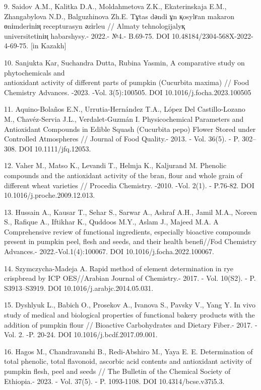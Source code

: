 \begin{references}
9. Saidov A.M., Kalitka D.A., Moldahmetova Z.K., Ekaterinskaja E.M.,
Zhangabylova N.D., Balguzhinova Zh.E. Tұtas dәndі ұn қosylғan makaron
өnіmderіnің recepturasyn әzіrleu // Almaty tehnologijalyқ\\
universitetіnің habarshysy.- 2022.- №4.- B.69-75. DOI
10.48184/2304-568X-2022-4-69-75. {[}in Kazakh{]}

10. Sanjukta Kar, Suchandra Dutta, Rubina Yasmin, A comparative study on
phytochemicals and \\antioxidant activity of different parts of pumpkin
(Cucurbita maxima) // Food Chemistry Advances. -2023. -Vol. 3(5):100505.
DOI 10.1016/j.focha.2023.100505

11. Aquino-Bolaños E.N., Urrutia-Hernández T.A., López Del
Castillo-Lozano M., Chavéz-Servia J.L., Verdalet-Guzmán I.
Physicochemical Parameters and Antioxidant Compounds in Edible Squash
(Cucurbita pepo) Flower Stored under Controlled Atmospheres // Journal
of Food Quality.- 2013. - Vol. 36(5). - P. 302--308. DOI
10.1111/jfq.12053.

12. Vaher M., Matso K., Levandi T., Helmja K., Kaljurand M. Phenolic
compounds and the antioxidant activity of the bran, flour and whole
grain of different wheat varieties // Procedia Chemistry. -2010. -Vol.
2(1). - P.76-82. DOI 10.1016/j.proche.2009.12.013.

13. Hussain A., Kausar T., Sehar S., Sarwar A., Ashraf A.H., Jamil M.A.,
Noreen S., Rafique A., Iftikhar K., Quddoos M.Y., Aslam J., Majeed M.A.
A Comprehensive review of functional ingredients, especially bioactive
compounds present in pumpkin peel, flesh and seeds, and their health
benefi//Fod Chemistry Advances.- 2022.-Vol.1(4):100067.
DOI 10.1016/j.focha.2022.100067.

14. Szymczycha-Madeja A. Rapid method of element determination in rye
crispbread by ICP OES//Arabian Journal of Chemistry.- 2017. - Vol.
10(S2). - P. S3913--S3919. DOI 10.1016/j.arabjc.2014.05.031.

15. Dyshlyuk L., Babich O., Prosekov A., Ivanova S., Pavsky V., Yang Y.
In vivo study of medical and biological properties of functional bakery
products with the addition of pumpkin flour // Bioactive Carbohydrates
and Dietary Fiber.- 2017. -Vol. 2. -P. 20-24.
DOI 10.1016/j.bcdf.2017.09.001.

16. Hagos M., Chandravanshi B., Redi-Abshiro M., Yaya E. E. Determination
of total phenolic, total flavonoid, ascorbic acid contents and
antioxidant activity of pumpkin flesh, peel and seeds // The Bulletin of
the Chemical Society of Ethiopia.- 2023. - Vol. 37(5). - P. 1093-1108.
DOI 10.4314/bcse.v37i5.3.


\end{references}

